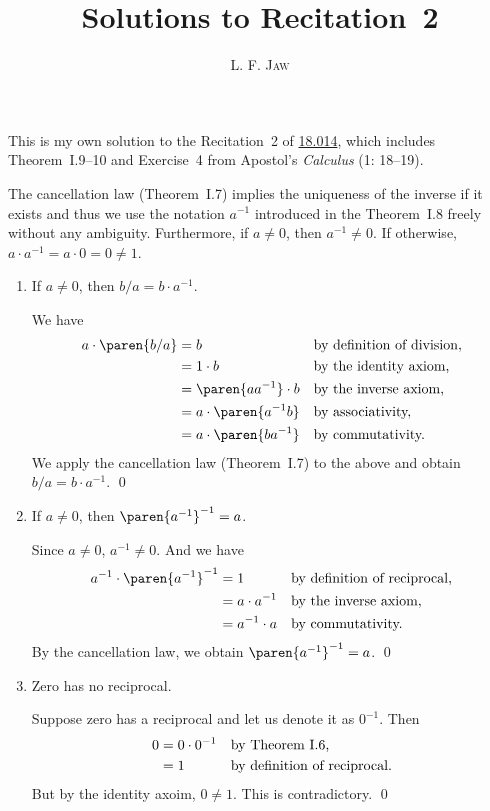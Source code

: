 \documentclass[a4paper]{article}
\title{Solutions to Recitation~2}
\author{L. F. \textsc{Jaw}}
\begin{document}
\maketitle

This is my own solution to the Recitation~2 of
\href{https://ocw.mit.edu/courses/mathematics/18-014-calculus-with-theory-fall-2010/recitations/}{18.014},
which includes Theorem~I.9--10 and Exercise~4 from Apostol's
\textit{Calculus} (1: 18--19).

\pskip

The cancellation law (Theorem~I.7) implies the uniqueness of the
inverse if it exists and thus we use the notation \(a^{-1}\)
introduced in the Theorem~I.8 freely without any ambiguity.
Furthermore, if \(a \ne 0\), then \(a^{-1} \ne 0\).  If otherwise,
\(a \cdot a^{-1} = a \cdot 0 = 0 \ne 1\).

\begin{enumerate}
\item If \(a \ne 0\), then \(b/a = b \cdot a^{-1}\).

  We have
  \begin{align*}
    a \cdot \paren{b/a}
    &= b                        && \reason{by definition of division,} \\
    &= 1 \cdot b                && \reason{by the identity axiom,}\\
    &= \paren{aa^{-1}} \cdot b  && \reason{by the inverse axiom,} \\
    &= a \cdot \paren{a^{-1} b} && \reason{by associativity,} \\
    &= a \cdot \paren{ba^{-1}}  && \reason{by commutativity.}
  \end{align*}
  We apply the cancellation law (Theorem~I.7) to the above and obtain
  \(b/a = b \cdot a^{-1}\).  \qed

\item If \(a \ne 0\), then \(\paren{a^{-1}}^{-1} = a\).

  Since \(a \ne 0\), \(a^{-1} \ne 0\).  And we have
  \begin{align*}
    a^{-1} \cdot \paren{a^{-1}}^{-1}
    &= 1              && \reason{by definition of reciprocal,} \\
    &= a \cdot a^{-1} && \reason{by the inverse axiom,} \\
    &= a^{-1} \cdot a && \reason{by commutativity.}
  \end{align*}
  By the cancellation law, we obtain \(\paren{a^{-1}}^{-1} = a\).  \qed

\item Zero has no reciprocal.

  Suppose zero has a reciprocal and let us denote it as \(0^{-1}\).  Then
  \begin{align*}
    0 &= 0 \cdot 0^{-1} && \text{by Theorem~I.6,} \\
      &= 1              && \text{by definition of reciprocal.}
  \end{align*}
  But by the identity axoim, \(0 \ne 1\).  This is contradictory.  \qed
\end{enumerate}
\end{document}
